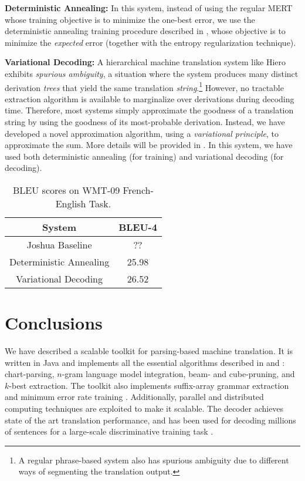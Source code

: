 \documentclass[11pt]{article}
\begin{document}
\textbf{Deterministic Annealing: } In this system, instead of using the regular MERT \cite{Och2003c} whose training objective is to minimize the one-best error, we use the deterministic annealing training procedure described in , whose objective is to minimize the \emph{expected} error (together with the entropy regularization technique).

\textbf{Variational Decoding: }  A hierarchical machine translation system like Hiero exhibits \emph{spurious ambiguity}, a situation where the system
produces many distinct derivation \emph{trees} that yield the same translation \emph{string}.\footnote{A regular phrase-based system also has spurious ambiguity due to different ways of segmenting the translation output.} However, no tractable extraction algorithm is available to marginalize over derivations during decoding time. Therefore, most systems simply approximate the goodness of a translation string by using the goodness of its most-probable derivation. Instead, we have developed a novel approximation algorithm, using a \emph{variational principle}, to approximate the sum.
More details will be provided in . In this system, we have used both deterministic annealing (for training) and variational decoding (for decoding).



\begin{table}[t]
\begin{center}
\begin{tabular}{c c}\hline
System & BLEU-4 \\ \hline
Joshua Baseline & ?? \\
Deterministic Annealing & 25.98 \\
Variational Decoding & 26.52 \\ \hline
\end{tabular}
\end{center}
\caption{BLEU scores on WMT-09 French-English Task.}
\label{results-wmt09}
\end{table}

\section{Conclusions}
We have described a scalable toolkit for parsing-based machine translation. It is written in Java and implements all the essential algorithms described in  and : chart-parsing, $n$-gram language model integration, beam- and cube-pruning, and $k$-best extraction.
The toolkit also implements suffix-array grammar extraction \cite{Lopez2007} and minimum error rate training \cite{Och2003c}. Additionally, parallel and distributed computing techniques are exploited to make it scalable. The decoder achieves state of the art translation performance, and has been used for decoding millions of sentences for a large-scale discriminative training task \cite{Li2008}.
\end{document}

